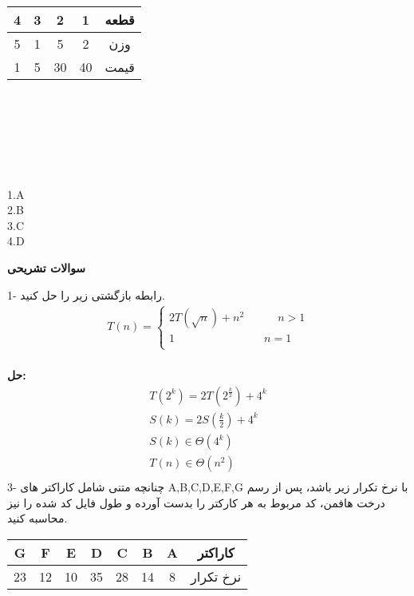 \documentclass{book}
\begin{document}
\begin{table}[htp]
\renewcommand{\arraystretch}{1.5}
\begin{tabular}{|c|c|c|c|c|}
\hline
 4 & 3 & 2 & 1 & قطعه \\ 
\hline
 5 & 1 & 5 & 2 & وزن \\ 
\hline
 1 & 5 & 30 & 40 & قیمت \\ \hline
\end{tabular}
\end{table}
\\
\\
\\
\\
\\
\\
1.A \\ 2.B \\ 3.C \\ 4.D \\

\begin{center}
\textbf{سوالات تشریحی}\\
\end{center}
1- رابطه بازگشتی زیر را حل کنید.\\
\begin{align*}
T(n)=\begin{cases}
 2T (\sqrt{n}) + n^2 \quad\quad\quad n>1 \\ 1 \quad\quad\quad\quad\quad\quad\quad\quad n=1 \\
    \end{cases}
\end{align*}
\\
\textbf{حل:}\\
\begin{align*}
T(2^k)=2T(2^{\frac{k}{2}}) + 4^k\\
S(k)=2S(\frac{k}{2})+4^k \\
S(k) \in \Theta (4^k) \\
T(n) \in \Theta (n^2) \\
\end{align*}
3- چنانچه متنی شامل کاراکتر های A,B,C,D,E,F,G  با نرخ تکرار زیر باشد، پس از رسم درخت هافمن، کد مربوط به هر کارکتر را بدست آورده و طول فایل کد شده را نیز محاسبه کنید.\\
\begin{table}[htp]
\renewcommand{\arraystretch}{1.5}
\begin{tabular}{|c|c|c|c|c|c|c|c|}
\hline
 G&F&E&D & C & B & A & کاراکتر \\ 
\hline
23&12&10 & 35 &28   &14 & 8 & نرخ تکرار\\ 
\hline

\end{tabular}
\end{table}
\\
\\
\end{document}
